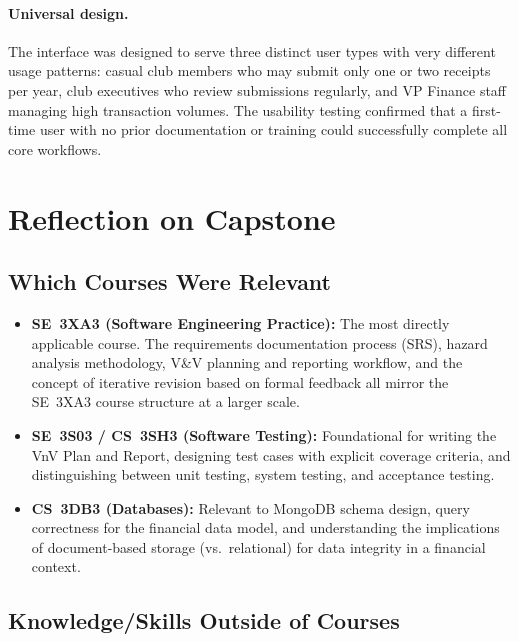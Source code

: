 \documentclass{article}
\begin{document}
\paragraph{Universal design.}
The interface was designed to serve three distinct user types with very
different usage patterns: casual club members who may submit only one or
two receipts per year, club executives who review submissions regularly,
and VP Finance staff managing high transaction volumes.  The usability
testing confirmed that a first-time user with no prior documentation or
training could successfully complete all core workflows.

\section{Reflection on Capstone}

\subsection{Which Courses Were Relevant}

\begin{itemize}
  \item \textbf{SE~3XA3 (Software Engineering Practice):}  The most
    directly applicable course.  The requirements documentation process
    (SRS), hazard analysis methodology, V\&V planning and reporting
    workflow, and the concept of iterative revision based on formal
    feedback all mirror the SE~3XA3 course structure at a larger scale.
  \item \textbf{SE~3S03 / CS~3SH3 (Software Testing):}  Foundational for
    writing the VnV Plan and Report, designing test cases with explicit
    coverage criteria, and distinguishing between unit testing, system
    testing, and acceptance testing.
  \item \textbf{CS~3DB3 (Databases):}  Relevant to MongoDB schema design,
    query correctness for the financial data model, and understanding the
    implications of document-based storage (vs.\ relational) for data
    integrity in a financial context.
\end{itemize}

\subsection{Knowledge/Skills Outside of Courses}
\end{document}
